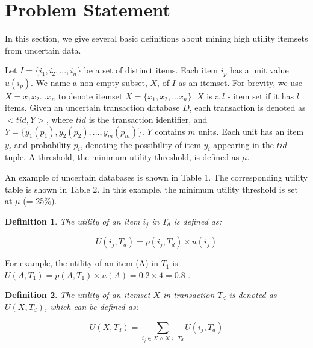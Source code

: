 \documentclass[conference]{IEEEtran}
\newtheorem{IEEEdef}{Definition}
\begin{document}
\section{Problem Statement}
In this section, we give several basic definitions about mining high utility itemsets from uncertain data.

Let $I =\{i_1,i_2,...,i_n\}$ be a set of distinct items. Each item $i_p$ has a unit value $u(i_p)$. We name a non-empty subset, $X$, of $I$ as an itemset. For brevity, we use $X = x_1x_2...x_n$ to denote itemset $X = \{x_1,x_2,...x_n\}$. $X$ is a $l$ - item set if it has $l$ items. Given an uncertain transaction database $D$, each transaction is denoted as $< tid, Y >$, where $tid$ is the transaction identifier, and $Y = \{y_1(p_1),y_2(p_2),...,y_m(p_m)\}$. $Y$ contains $m$ units. Each unit has an item $y_i$ and probability $p_i$, denoting the possibility of item $y_i$ appearing in the $tid$ tuple. A threshold, the minimum utility threshold, is defined as $\mu$.

An example of uncertain databases is shown in Table 1. The corresponding utility table is shown in Table 2. In this example, the minimum utility threshold is set at $\mu$ (= 25\%).



\begin{IEEEdef}
\label{def:UI}
The utility of an item $i_j$ in $T_d$ is defined as:
\end{IEEEdef}

\vspace{-0.5cm}
\begin{equation}
\label{eq:UI}
U(i_j, T_d) =
p(i_j, T_d) \times u(i_j)
\end{equation}
\vspace{-0.5cm}

For example, the utility of an item (A) in $T_1$ is $U(A, T_1)= p(A, T_1) \times u(A) = 0.2 \times 4 = 0.8$ .

\begin{IEEEdef}
\label{def:UX}
The utility of an itemset $X$ in transaction $T_d$ is denoted as $U(X, T_d)$, which can be defined as:
\end{IEEEdef}

\vspace{-0.4cm}
\begin{equation}
\label{eq:UX}
U(X,T_d)
= \sum_{i_j \in X \wedge X \subseteq T_d}
U(i_j, T_d)
\end{equation}
\vspace{-0.4cm}
\end{document}
